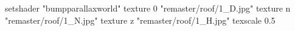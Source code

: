 setshader "bumpparallaxworld"
    texture 0 "remaster/roof/1_D.jpg"
    texture n "remaster/roof/1_N.jpg"
    texture z "remaster/roof/1_H.jpg"
    texscale 0.5